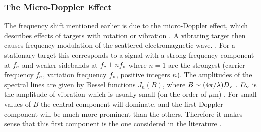 \documentclass[11pt,twoside]{eitExjobb}
\begin{document}
	\subsubsection{The Micro-Doppler Effect}
	The frequency shift mentioned earlier is due to the micro-Doppler effect, which describes effects of targets with rotation or vibration \cite{Buerkle2007}. A vibrating target then causes frequency modulation of the scattered electromagnetic wave. \cite{Chen2006}. For a stationary target this corresponds to a signal with a strong frequency component at $f_{\mathrm{c}}$ and weaker sidebands at $f_{\mathrm{c}} \pm n f_{\mathrm{v}}$ where $n=1$ are the strongest (carrier frequency $f_{\mathrm{c}}$, variation frequency $f_{\mathrm{v}}$, positive integers $n$). The amplitudes of the spectral lines are given by Bessel functions $J_n(B)$, where $B \sim (4\pi/\lambda)D_{\mathrm{v}}$ \cite{Chen2006}. $D_{\mathrm{v}}$ is the amplitude of vibration which is usually small (on the order of $\mu$m) \cite{Buerkle2007}\cite{Top2014}. For small values of $B$ the central component will dominate, and the first Doppler component will be much more prominent than the others. Therefore it makes sense that this first component is the one considered in the literature \cite{Buerkle2007}.
	
	
\end{document}
